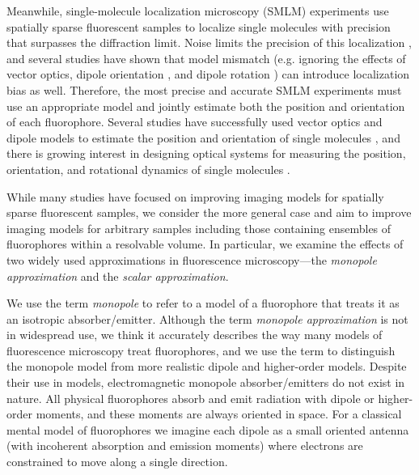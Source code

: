 \documentclass[]{osa-article}
\begin{document}
Meanwhile, single-molecule localization microscopy (SMLM) experiments use
spatially sparse fluorescent samples to localize single molecules with precision
that surpasses the diffraction limit. Noise limits the precision of this
localization \cite{foreman2011, chao2016}, and several studies have shown that
model mismatch (e.g. ignoring the effects of vector optics, dipole orientation
\cite{backlund2014}, and dipole rotation \cite{lew2013}) can introduce
localization bias as well. Therefore, the most precise and accurate SMLM
experiments must use an appropriate model and jointly estimate both the position
and orientation of each fluorophore. Several studies have successfully used
vector optics and dipole models to estimate the position and orientation of
single molecules \cite{bohmer2003, lieb2004, toprak2006, aguet2009}, and there
is growing interest in designing optical systems for measuring the position,
orientation, and rotational dynamics of single molecules \cite{agrawal2012,
  backer2014, stallinga2015, zhang2018, zhang2018-2}.

While many studies have focused on improving imaging models for spatially sparse
fluorescent samples, we consider the more general case and aim to improve
imaging models for arbitrary samples including those containing ensembles of
fluorophores within a resolvable volume. In particular, we examine the effects
of two widely used approximations in fluorescence microscopy---the
\textit{monopole approximation} and the \textit{scalar approximation}.

We use the term \textit{monopole} to refer to a model of a fluorophore that
treats it as an isotropic absorber/emitter. Although the term \textit{monopole
  approximation} is not in widespread use, we think it accurately describes the
way many models of fluorescence microscopy treat fluorophores, and we use the
term to distinguish the monopole model from more realistic dipole and
higher-order models. Despite their use in models, electromagnetic monopole
absorber/emitters do not exist in nature. All physical fluorophores absorb and
emit radiation with dipole or higher-order moments, and these moments are always
oriented in space. For a classical mental model of fluorophores we imagine each
dipole as a small oriented antenna (with incoherent absorption and emission
moments) where electrons are constrained to move along a single direction. %
\end{document}
